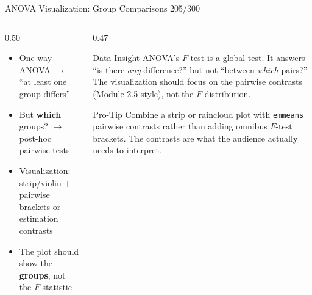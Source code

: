 \documentclass[10pt]{beamer}
\newcommand{\smark}[1]{\hfill{\scriptsize\color{codegray}#1}}
\begin{document}
\begin{frame}{ANOVA Visualization: Group Comparisons}
\smark{205/300}
\begin{columns}[T]
\begin{column}{0.50\textwidth}
\begin{itemize}
    \item One-way ANOVA $\to$ ``at least one group differs''
    \item But \textbf{which} groups? $\to$ post-hoc pairwise tests
    \item Visualization: strip/violin + pairwise brackets or estimation contrasts
    \item The plot should show the \textbf{groups}, not the $F$-statistic
\end{itemize}
\end{column}
\begin{column}{0.47\textwidth}
\begin{exampleblock}{Data Insight}
    \scriptsize ANOVA's $F$-test is a global test. It answers ``is there \emph{any} difference?'' but not ``between \emph{which} pairs?'' The visualization should focus on the pairwise contrasts (Module 2.5 style), not the $F$ distribution.
\end{exampleblock}
\vspace{0.1cm}
\begin{alertblock}{Pro-Tip}
    \scriptsize Combine a strip or raincloud plot with \texttt{emmeans} pairwise contrasts rather than adding omnibus $F$-test brackets. The contrasts are what the audience actually needs to interpret.
\end{alertblock}
\end{column}
\end{columns}
\end{frame}
\end{document}
